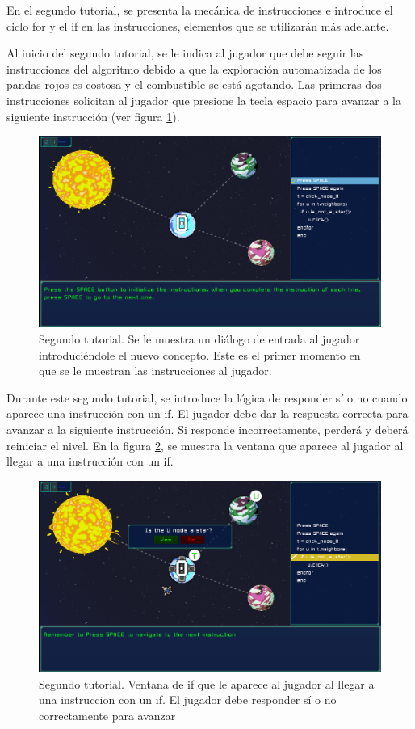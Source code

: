 En el segundo tutorial, se presenta la mecánica de instrucciones e introduce el ciclo for y el if en las instrucciones, elementos que se utilizarán más adelante.

Al inicio del segundo tutorial, se le indica al jugador que debe seguir las instrucciones del algoritmo debido a que la exploración automatizada de los pandas rojos es costosa y el combustible se está agotando. Las primeras dos instrucciones solicitan al jugador que presione la tecla espacio para avanzar a la siguiente instrucción (ver figura \ref{SecondTutorial}).


\begin{figure}[h]
	\centering
	\includegraphics[scale=0.2]{imagenes/SecondTutorial.png}
	\caption{Segundo tutorial. Se le muestra un diálogo de entrada al jugador introduciéndole el nuevo concepto. Este es el primer momento en que se le muestran las instrucciones al jugador.}
	\label{SecondTutorial}
\end{figure}

Durante este segundo tutorial, se introduce la lógica de responder sí o no cuando aparece una instrucción con un if. El jugador debe dar la respuesta correcta para avanzar a la siguiente instrucción. Si responde incorrectamente, perderá y deberá reiniciar el nivel. En la figura \ref{SecondTutorialShowingIf}, se muestra la ventana que aparece al jugador al llegar a una instrucción con un if.

\begin{figure}[h]
	\centering
	\includegraphics[scale=0.3]{imagenes/SecondTutorialShowingIf.png}
	\caption{Segundo tutorial. Ventana de if que le aparece al jugador al llegar a una instruccion con un if. El jugador debe responder sí o no correctamente para avanzar}
	\label{SecondTutorialShowingIf}
\end{figure}

